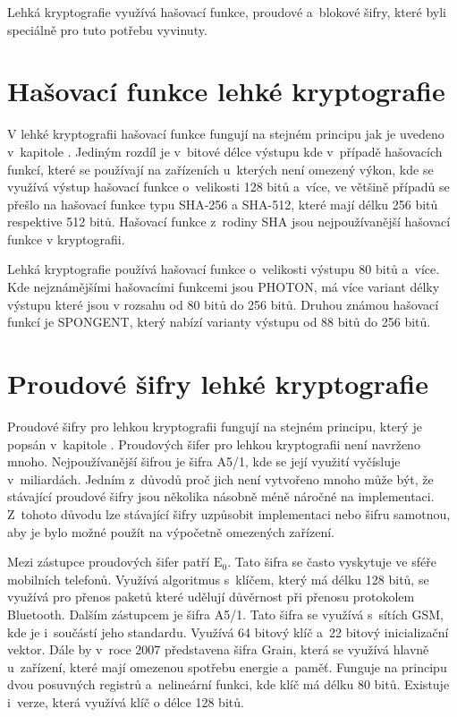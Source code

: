Lehká kryptografie využívá hašovací funkce, proudové a~blokové šifry, které byli speciálně pro tuto potřebu vyvinuty.\cite{Klima}


\section{Hašovací funkce lehké kryptografie}
V lehké kryptografii hašovací funkce fungují na stejném principu jak je uvedeno v~kapitole . Jediným rozdíl je v~bitové délce výstupu kde v~případě hašovacích funkcí, které se používají na zařízeních u~kterých není omezený výkon, kde se využívá výstup hašovací funkce o~velikosti 128 bitů a~více, ve většině případů se přešlo na hašovací funkce typu SHA-256 a SHA-512, které mají délku 256 bitů respektive 512 bitů. Hašovací funkce z~rodiny SHA jsou nejpoužívanější hašovací funkce v kryptografii. 

Lehká kryptografie používá hašovací funkce o~velikosti výstupu 80 bitů a~více. Kde nejznámějšími hašovacími funkcemi jsou PHOTON, má více variant délky výstupu které jsou v rozsahu od 80 bitů do 256 bitů. Druhou známou hašovací funkcí je SPONGENT, který nabízí varianty výstupu od 88 bitů do 256 bitů.%

\section{Proudové šifry lehké kryptografie}
Proudové šifry pro lehkou kryptografii fungují na stejném principu, který je popsán v~kapitole . Proudových šifer pro lehkou kryptografii není navrženo mnoho. Nejpoužívanější šifrou je šifra A5/1, kde se její využití vyčísluje v~miliardách. Jedním z~důvodů proč jich není vytvořeno mnoho může být, že stávající proudové šifry jsou několika násobně méně náročné na implementaci. Z~tohoto důvodu lze stávající šifry uzpůsobit implementaci nebo šifru samotnou, aby je bylo možné použít na výpočetně omezených zařízení.

Mezi zástupce proudových šifer patří $\mathrm{E_0}$. Tato šifra se často vyskytuje ve sféře mobilních telefonů. Využívá algoritmus s~klíčem, který má délku 128 bitů, se využívá pro přenos paketů které udělují důvěrnost při přenosu protokolem Bluetooth. Dalším zástupcem je šifra A5/1. Tato šifra se využívá s~sítích GSM, kde je i~součástí jeho standardu. Využívá 64 bitový klíč a~22 bitový inicializační vektor. Dále by v~roce 2007 představena šifra Grain, která se využívá hlavně u~zařízení, které mají omezenou spotřebu energie a~paměť. Funguje na principu dvou posuvných registrů a~nelineární funkci, kde klíč má délku 80 bitů. Existuje i~verze, která využívá klíč o délce 128 bitů. %

